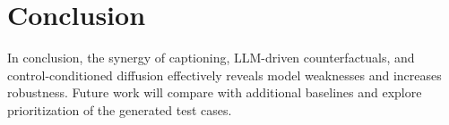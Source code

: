 \section{Conclusion}
\label{sec:conclusion}

In conclusion, the synergy of captioning, LLM-driven counterfactuals, and control-conditioned diffusion effectively reveals model weaknesses and increases robustness. Future work will compare with additional baselines and explore prioritization of the generated test cases.
